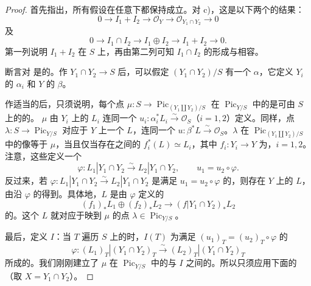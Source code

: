 \begin{proof}
首先指出，所有假设在任意下都保持成立。对 c)，这是以下两个的结果：
\[
0\longrightarrow I_1+I_2\longrightarrow\mathcal O_Y\longrightarrow\mathcal O_{Y_1\cap Y_2}\longrightarrow0
\]
及
\[
0\longrightarrow I_1\cap I_2\longrightarrow I_1\oplus I_2\longrightarrow I_1+I_2\longrightarrow0.
\]
第一列说明 $I_1+I_2$ 在 $S$ 上，再由第二列可知 $I_1\cap I_2$ 的形成与相容。

断言对 是的。作 $Y_1\cap Y_2\to S$ 后，可以假定 $(Y_1\cap Y_2)/S$ 有一个 $\alpha$，它定义 $Y_i$ 的 $\alpha_i$ 和 $Y$ 的 $\beta$。

作适当的后，只须说明，每个点 $\mu:S\to\operatorname{Pic}_{(Y_1\amalg Y_2)/S}$ 在 $\operatorname{Pic}_{Y/S}$ 中的是可由 $S$ 上的的。
$\mu$ 由 $Y_i$ 上的 $L_i$ 连同一个 $u_i:\alpha_i^*L_i\xrightarrow\sim\mathcal O_S$（$i=1,2$）定义。同样，点 $\lambda:S\to\operatorname{Pic}_{Y/S}$ 对应于 $Y$ 上一个 $L$，连同一个 $u:\beta^*L\xrightarrow\sim\mathcal O_S$。$\lambda$ 在 $\operatorname{Pic}_{(Y_1\amalg Y_2)/S}$ 中的像等于 $\mu$，当且仅当存在之间的 $f_i^*(L)\simeq L_i$，其中 $f_i:Y_i\to Y$ 为，$i=1,2$。注意，这些定义一个
\[
\varphi:L_1|Y_1\cap Y_2\xrightarrow\sim L_2|Y_1\cap Y_2,
\qquad u_1=u_2\circ\varphi.
\]
反过来，若 $\varphi:L_1|Y_1\cap Y_2\xrightarrow\sim L_2|Y_1\cap Y_2$ 是满足 $u_1=u_2\circ\varphi$ 的，则存在 $Y$ 上的 $L$，由沿 $\varphi$ 的得到。具体地，$L$ 是由 $\varphi$ 定义的
\[
(f_1)_*L_1\oplus(f_2)_*L_2\longrightarrow(f|Y_1\cap Y_2)_*L_2
\]
的。这个 $L$ 就对应于映到 $\mu$ 的点 $\lambda\in\operatorname{Pic}_{Y/S}$。

最后，定义 $I$：当 $T$ 遍历 $S$ 上的时，$I(T)$ 为满足 $(u_1)_T=(u_2)_T\circ\varphi$ 的
\[
\varphi:(L_1)_T|(Y_1\cap Y_2)_T\xrightarrow\sim(L_2)_T|(Y_1\cap Y_2)_T
\]
所成的。我们刚刚建立了 $\mu$ 在 $\operatorname{Pic}_{Y/S}$ 中的与 $I$ 之间的。所以只须应用下面的（取 $X=Y_1\cap Y_2$）。
\end{proof}


